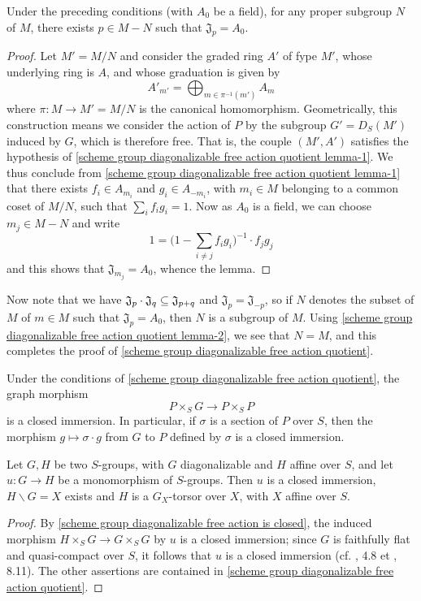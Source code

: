 \begin{lemma}\label{scheme group diagonalizable free action quotient lemma-2}
Under the preceding conditions (with $A_0$ be a field), for any proper subgroup $N$ of $M$, there exists $p\in M-N$ such that $\mathfrak{J}_p=A_0$.
\end{lemma}
\begin{proof}
Let $M'=M/N$ and consider the graded ring $A'$ of fype $M'$, whose underlying ring is $A$, and whose graduation is given by
\[A'_{m'}=\bigoplus_{m\in\pi^{-1}(m')}A_m\]
where $\pi:M\to M'=M/N$ is the canonical homomorphism. Geometrically, this construction means we consider the action of $P$ by the subgroup $G'=D_S(M')$ induced by $G$, which is therefore free. That is, the couple $(M',A')$ satisfies the hypothesis of \cref{scheme group diagonalizable free action quotient lemma-1}. We thus conclude from \cref{scheme group diagonalizable free action quotient lemma-1} that there exists $f_i\in A_{m_i}$ and $g_i\in A_{-m_i}$, with $m_i\in M$ belonging to a common coset of $M/N$, such that $\sum_if_ig_i=1$. Now as $A_0$ is a field, we can choose $m_j\in M-N$ and write
\[1=\Big(1-\sum_{i\neq j}f_ig_i\Big)^{-1}\cdot f_jg_j\]
and this shows that $\mathfrak{J}_{m_j}=A_0$, whence the lemma.
\end{proof}

Now note that we have $\mathfrak{J}_p\cdot\mathfrak{J}_q\subseteq\mathfrak{J}_{p+q}$ and $\mathfrak{J}_p=\mathfrak{J}_{-p}$, so if $N$ denotes the subset of $M$ of $m\in M$ such that $\mathfrak{J}_p=A_0$, then $N$ is a subgroup of $M$. Using \cref{scheme group diagonalizable free action quotient lemma-2}, we see that $N=M$, and this completes the proof of \cref{scheme group diagonalizable free action quotient}. 

\begin{corollary}\label{scheme group diagonalizable free action is closed}
Under the conditions of \cref{scheme group diagonalizable free action quotient}, the graph morphism
\[P\times_SG\to P\times_SP\]
is a closed immersion. In particular, if $\sigma$ is a section of $P$ over $S$, then the morphism $g\mapsto \sigma\cdot g$ from $G$ to $P$ defined by $\sigma$ is a closed immersion.
\end{corollary}

\begin{corollary}\label{scheme group diagonaizable quotient by monomorphism prop}
Let $G,H$ be two $S$-groups, with $G$ diagonalizable and $H$ affine over $S$, and let $u:G\to H$ be a monomorphism of $S$-groups. Then $u$ is a closed immersion, $H\backslash G=X$ exists and $H$ is a $G_X$-torsor over $X$, with $X$ affine over $S$.
\end{corollary}
\begin{proof}
By \cref{scheme group diagonalizable free action is closed}, the induced morphism $H\times_SG\to G\times_SG$ by $u$ is a closed immersion; since $G$ is faithfully flat and quasi-compact over $S$, it follows that $u$ is a closed immersion (cf. \cite{EGA1},  4.8 et \cite{EGA4-3}, 8.11). The other assertions are contained in \cref{scheme group diagonalizable free action quotient}.
\end{proof}

